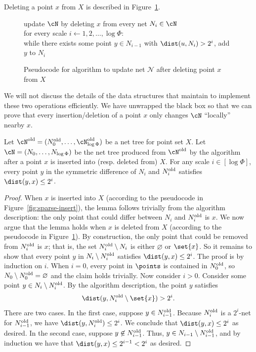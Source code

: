%
\noindent Deleting a point $x$ from $X$ is described in Figure~\ref{fig:sparse-delete}.
\begin{figure}[h!]
    \centering
    \begin{algorithm}
    update $\cN$ by deleting $x$ from every net $N_i \in \cN$
    \\ for every scale $i \gets 1, 2, \ldots, \log \Phi$:\+
    \\      while there exists some point $y \in N_{i-1}$ with $\dist(u, N_{i}) > 2^i$, add $y$ to $N_i$\-
    \end{algorithm}
    \caption{Pseudocode for \cite{gao2004deformable} algorithm to update net $\mathcal{N}$ after deleting point $x$ from $X$}
    \label{fig:sparse-delete}
\end{figure}
%
We will not discuss the details of the data structures that \cite{gao2004deformable} maintain to implement these two operations efficiently. We have unwrapped the \cite{gao2004deformable} black box so that we can prove that every insertion/deletion of a point $x$ only changes $\cN$ ``locally'' nearby $x$.
\begin{lemma}
\label{lem:net-delete-local}
Let $\cN^{\rm old} = (N_0^{\rm old}, \ldots, \cN_{\log \Phi}^{\rm old})$ be a net tree for point set $X$. Let $\cN = (N_0, \ldots, N_{\log \Phi})$ be the net tree produced from $\cN^{\rm old}$ by the \cite{gao2004deformable} algorithm after a point $x$ is inserted into (resp. deleted from) $X$. For any scale $i \in [\log \Phi]$, every point $y$ in the symmetric difference of $N_i$ and $N^{\rm old}_i$ satisfies $\dist(y,x) \le 2^i$.
\end{lemma}
\begin{proof}
When $x$ is inserted into $X$ (according to the pseudocode in Figure~\ref{fig:sparse-insert}), the lemma follows trivially from the \cite{gao2004deformable} algorithm description: the only point that could differ between $N_i$ and $N^{\rm old}_i$ is $x$. We now argue that the lemma holds when $x$ is deleted from $X$ (according to the pseudocode in Figure~\ref{fig:sparse-delete}).
    By construction, the only point that could be removed from $N_i^{\rm old}$ is $x$; that is, the set $N_i^{\rm old} \setminus N_i$ is either $\varnothing$ or $\set{x}$. So it remains to show that every point $y$ in $N_i \setminus N^{\rm old}_i$ satisfies $\dist(y,x) \le 2^i$.
% 
    The proof is by induction on $i$. When $i=0$, every point in $\points$ is contained in $N^{\rm old}_0$, so $N_0 \setminus N^{\rm old}_0 = \varnothing$ and the claim holds trivially. Now consider $i > 0$. Consider some point $y \in N_i \setminus N_i^{\rm old}$. By the algorithm description, the point $y$ satisfies
    \[\dist(y, N^{\rm old}_{i} \setminus \set{x}) > 2^i.\]
    There are two cases. In the first case, suppose $y \in N^{\rm old}_{i-1}$. Because $N^{\rm old}_{i}$ is a $2^i$-net for $N^{\rm old}_{i-1}$, we have $\dist(y, N^{\rm old}_i) \le 2^i$. We conclude that $\dist(y, x) \le 2^i$ as desired.
    In the second case, suppose $y \not \in N^{\rm old}_{i-1}$. Thus, $y \in N_{i-1} \setminus N^{\rm old}_{i-1}$, and by induction we have that $\dist(y, x) \le 2^{i-1} < 2^i$ as desired.
\end{proof}
